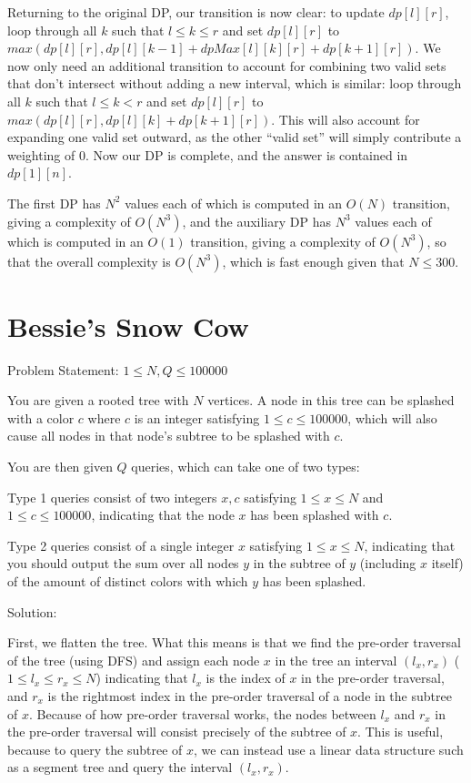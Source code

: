 \documentclass{article}
\begin{document}
Returning to the original DP, our transition is now clear: to update $dp[l][r]$, loop through all $k$ such that $l \leq k \leq r$ and set $dp[l][r]$ to $max(dp[l][r], dp[l][k  - 1] + dpMax[l][k][r] + dp[k + 1][r])$. We now only need an additional transition to account for combining two valid sets that don’t intersect without adding a new interval, which is similar: loop through all $k$ such that $l \leq k < r$ and set $dp[l][r]$ to $max(dp[l][r], dp[l][k] + dp[k + 1][r])$. This will also account for expanding one valid set outward, as the other “valid set” will simply contribute a weighting of $0$. Now our DP is complete, and the answer is contained in $dp[1][n]$.

The first DP has $N^2$ values each of which is computed in an $O(N)$ transition, giving a complexity of $O(N^3)$, and the auxiliary DP has $N^3$ values each of which is computed in an $O(1)$ transition, giving a complexity of $O(N^3)$, so that the overall complexity is $O(N^3)$, which is fast enough given that $N \leq 300$.

\section{Bessie's Snow Cow}

Problem Statement: $1 \leq N, Q \leq 100000$

You are given a rooted tree with $N$ vertices. A node in this tree can be splashed with a color $c$ where $c$ is an integer satisfying $1 \leq c \leq 100000$, which will also cause all nodes in that node's subtree to be splashed with $c$.

You are then given $Q$ queries, which can take one of two types:

Type 1 queries consist of two integers $x,c$ satisfying $1 \leq x \leq N$ and $1 \leq c \leq 100000$, indicating that the node $x$ has been splashed with $c$.

Type 2 queries consist of a single integer $x$ satisfying $1 \leq x \leq N$, indicating that you should output the sum over all nodes $y$ in the subtree of $y$ (including $x$ itself) of the amount of distinct colors with which $y$ has been splashed.

Solution:

First, we flatten the tree. What this means is that we find the pre-order traversal of the tree (using DFS) and assign each node $x$ in the tree an interval $(l_x, r_x)$ ($1 \leq l_x \leq r_x \leq N$) indicating that $l_x$ is the index of $x$ in the pre-order traversal, and $r_x$ is the rightmost index in the pre-order traversal of a node in the subtree of $x$. Because of how pre-order traversal works, the nodes between $l_x$ and $r_x$ in the pre-order traversal will consist precisely of the subtree of $x$. This is useful, because to query the subtree of $x$, we can instead use a linear data structure such as a segment tree and query the interval $(l_x, r_x)$.
\end{document}
